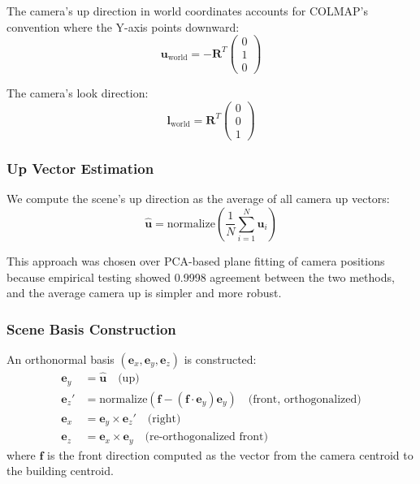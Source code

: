 \documentclass[11pt, letterpaper]{article}
\begin{document}
The camera's up direction in world coordinates accounts for COLMAP's convention where the Y-axis points downward:
\begin{equation}
    \mathbf{u}_{\text{world}} = -\mathbf{R}^T \begin{pmatrix} 0 \\ 1 \\ 0 \end{pmatrix}
\end{equation}

The camera's look direction:
\begin{equation}
    \mathbf{l}_{\text{world}} = \mathbf{R}^T \begin{pmatrix} 0 \\ 0 \\ 1 \end{pmatrix}
\end{equation}

\subsubsection{Up Vector Estimation}

We compute the scene's up direction as the average of all camera up vectors:
\begin{equation}
    \hat{\mathbf{u}} = \text{normalize}\left(\frac{1}{N}\sum_{i=1}^{N} \mathbf{u}_i\right)
\end{equation}

This approach was chosen over PCA-based plane fitting of camera positions because empirical testing showed 0.9998 agreement between the two methods, and the average camera up is simpler and more robust.

\subsubsection{Scene Basis Construction}

An orthonormal basis $(\mathbf{e}_x, \mathbf{e}_y, \mathbf{e}_z)$ is constructed:
\begin{align}
    \mathbf{e}_y &= \hat{\mathbf{u}} \quad \text{(up)} \\
    \mathbf{e}_z' &= \text{normalize}(\mathbf{f} - (\mathbf{f} \cdot \mathbf{e}_y)\mathbf{e}_y) \quad \text{(front, orthogonalized)} \\
    \mathbf{e}_x &= \mathbf{e}_y \times \mathbf{e}_z' \quad \text{(right)} \\
    \mathbf{e}_z &= \mathbf{e}_x \times \mathbf{e}_y \quad \text{(re-orthogonalized front)}
\end{align}
where $\mathbf{f}$ is the front direction computed as the vector from the camera centroid to the building centroid.
\end{document}
